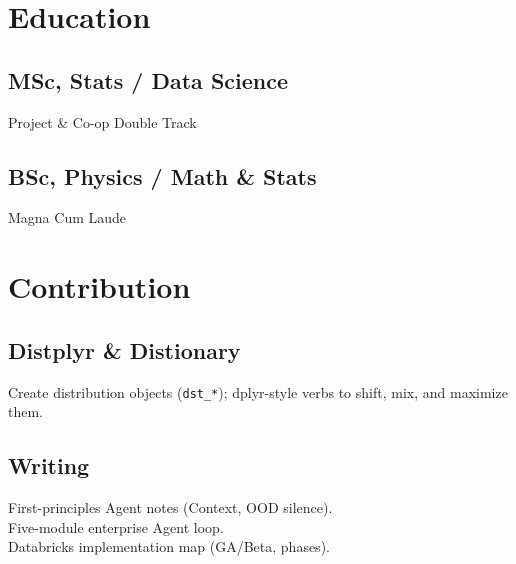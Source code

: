 \documentclass[letterpaper]{deedy-resume}
\begin{document}
\begin{minipage}[t]{0.33\textwidth}

\section{Education} 
\vspace{1mm}

\subsection{MSc, Stats / Data Science}
Project \& Co-op Double Track

\sectionspace %

\subsection{BSc, Physics / Math \& Stats}
Magna Cum Laude

\sectionspace %


\section{Contribution}
\vspace{1mm}
\subsection{Distplyr \& Distionary}
Create distribution objects (\texttt{dst\_*}); dplyr-style verbs to shift, mix, and maximize them.

\sectionspace

\subsection{Writing}
First-principles Agent notes (Context, OOD silence). \\
Five-module enterprise Agent loop. \\
Databricks implementation map (GA/Beta, phases).

\sectionspace %


\end{minipage}
\end{document}
